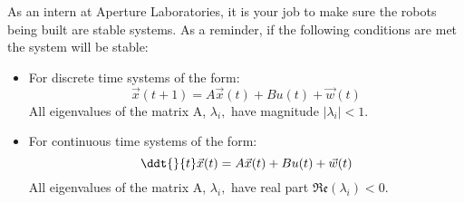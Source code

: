 

As an intern at Aperture Laboratories, it is your job to make sure the robots being built are stable systems.
As a reminder, if the following conditions are met the system will be stable:

\begin{itemize}

\item For discrete time systems of the form:
\begin{equation}
\vec{x}(t+1) = A\vec{x}(t) + Bu(t) + \vec{w}(t)
\end{equation}
All eigenvalues of the matrix A, $\lambda_{i},$ have magnitude $|\lambda_{i}| < 1.$

\item For continuous time systems of the form:
\begin{equation}
\ddt{}{t} \vec{x}(t) = A\vec{x}(t) + Bu(t) + \vec{w}(t)
\end{equation}
All eigenvalues of the matrix A, $\lambda_{i},$ have real part $\mathfrak{Re}(\lambda_{i})< 0.$
\end{itemize}

